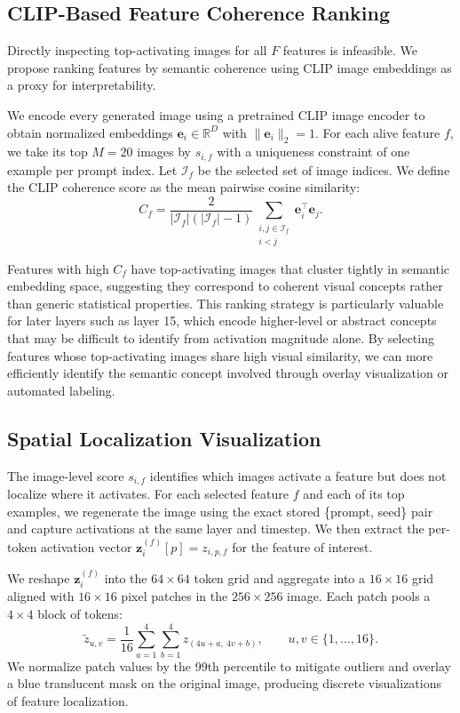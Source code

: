 \documentclass{article}
\begin{document}
\subsection{CLIP-Based Feature Coherence Ranking}

Directly inspecting top-activating images for all $F$ features is infeasible. We propose ranking features by semantic coherence using CLIP image embeddings as a proxy for interpretability.

We encode every generated image using a pretrained CLIP image encoder to obtain normalized embeddings $\mathbf{e}_i \in \mathbb{R}^{D}$ with $\lVert \mathbf{e}_i \rVert_2 = 1$. For each alive feature $f$, we take its top $M=20$ images by $s_{i,f}$ with a uniqueness constraint of one example per prompt index. Let $\mathcal{I}_f$ be the selected set of image indices. We define the CLIP coherence score as the mean pairwise cosine similarity:
\begin{equation}
C_f = \frac{2}{|\mathcal{I}_f|(|\mathcal{I}_f|-1)} \sum_{\substack{i,j \in \mathcal{I}_f\\ i<j}} \mathbf{e}_i^\top \mathbf{e}_j.
\end{equation}

Features with high $C_f$ have top-activating images that cluster tightly in semantic embedding space, suggesting they correspond to coherent visual concepts rather than generic statistical properties. This ranking strategy is particularly valuable for later layers such as layer 15, which encode higher-level or abstract concepts that may be difficult to identify from activation magnitude alone. By selecting features whose top-activating images share high visual similarity, we can more efficiently identify the semantic concept involved through overlay visualization or automated labeling.

\subsection{Spatial Localization Visualization}

The image-level score $s_{i,f}$ identifies which images activate a feature but does not localize where it activates. For each selected feature $f$ and each of its top examples, we regenerate the image using the exact stored \{prompt, seed\} pair and capture activations at the same layer and timestep. We then extract the per-token activation vector $\mathbf{z}^{(f)}_{i}[p] = z_{i,p,f}$ for the feature of interest.

We reshape $\mathbf{z}^{(f)}_{i}$ into the $64 \times 64$ token grid and aggregate into a $16 \times 16$ grid aligned with $16 \times 16$ pixel patches in the $256 \times 256$ image. Each patch pools a $4 \times 4$ block of tokens:
\begin{equation}
\tilde{z}_{u,v} = \frac{1}{16} \sum_{a=1}^{4}\sum_{b=1}^{4} z_{(4u+a,\ 4v+b)},
\qquad u,v \in \{1,\dots,16\}.
\end{equation}
We normalize patch values by the 99th percentile to mitigate outliers and overlay a blue translucent mask on the original image, producing discrete visualizations of feature localization.
\end{document}
